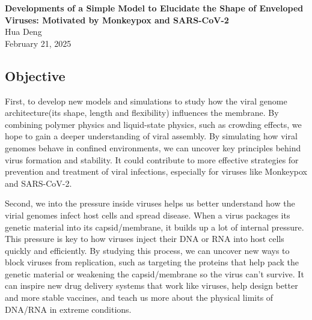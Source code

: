 \documentclass[12pt]{article}
\begin{document}
\doublespacing

\begin{center}
{\Large \textbf{Developments of a Simple Model to Elucidate the Shape of Enveloped Viruses: Motivated by Monkeypox and SARS-CoV-2}}\\[1.5ex]
{\normalsize  Hua Deng}\\

{\normalsize February 21, 2025}
\end{center}





\begin{flushleft}
\setlength{\parindent}{45pt}
\section*{Objective}
First, to develop new models and simulations to study how the viral genome architecture(its shape, length and flexibility) influences the membrane. By combining polymer physics and liquid-state physics, such as crowding effects, we hope to gain a deeper understanding of viral assembly. By simulating how viral genomes behave in confined environments, we can uncover key principles behind virus formation and stability. It could contribute to more effective strategies for prevention and treatment of viral infections, especially for viruses like Monkeypox and SARS-CoV-2.


Second, we into the pressure inside viruses helps us better understand how the virial genomes infect host cells and spread disease. When a virus packages its genetic material into its capsid/membrane, it builds up a lot of internal pressure. This pressure is key to how viruses inject their DNA or RNA into host cells quickly and efficiently. By studying this process, we can uncover new ways to block viruses from replication, such as targeting the proteins that help pack the genetic material or weakening the capsid/membrane so the virus can’t survive. It can inspire new drug delivery systems that work like viruses, help design better and more stable vaccines, and teach us more about the physical limits of DNA/RNA in extreme conditions.

\vspace{-1em} 

\end{flushleft}
\end{document}
